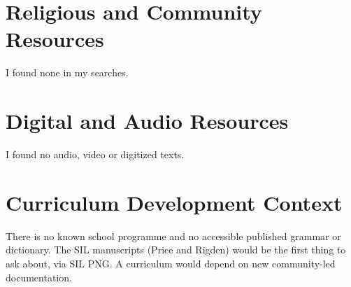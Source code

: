 \documentclass[12pt]{article}
\begin{document}
\section{Religious and Community Resources}
I found none in my searches.

\section{Digital and Audio Resources}
I found no audio, video or digitized texts.

\section{Curriculum Development Context}
There is no known school programme and no accessible published grammar or dictionary. The SIL manuscripts (Price and Rigden) would be the first thing to ask about, via SIL PNG. A curriculum would depend on new community-led documentation.
\end{document}
